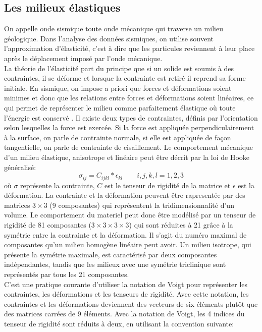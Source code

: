 \subsection{Les milieux élastiques}
 On appelle onde sismique toute onde mécanique qui traverse un milieu géologique. Dans l'analyse des données sismiques, on utilise souvent l'approximation d'élasticité, c'est à dire que les particules reviennent à leur place après le déplacement imposé par l'onde mécanique.\\
La théorie de l'élasticité part du principe que si un solide est soumis à des contraintes, il se déforme et lorsque la contrainte est retiré il reprend sa forme initiale. En sismique, on impose a priori que forces et déformations soient minimes et donc que les relations entre forces et déformations soient linéaires, ce qui permet de représenter le milieu comme parfaitement élastique où toute l'énergie est conservé \citep{Sheriff1995}. Il existe deux types de contraintes, définis par l’orientation selon lesquelles la force est exercée. Si la force est appliquée perpendiculairement à la surface, on parle de contrainte normale, si elle est appliquée de façon tangentielle, on parle de contrainte de cisaillement. Le comportement mécanique d’un milieu élastique, anisotrope et linéaire peut être décrit par la loi de Hooke généralisé:
\begin{equation}
\sigma_{ij} = C_{ijkl}*\epsilon_{kl} \qquad i,j,k,l = 1,2,3
\label{eq:hooke}
\end{equation}
où $\sigma$ représente la contrainte, $C$ est le tenseur de rigidité de la matrice et $\epsilon$ est la déformation.
La contrainte et la déformation peuvent être rapresentée par des matrices $3 \times 3$ (9 composantes) qui représentent la tridimensionnalité d’un volume. Le comportement du materiel peut donc être modélisé par un tenseur de rigidité de 81 composantes ($3 \times 3 \times 3 \times 3$) qui sont réduites à 21 grâce à la symétrie entre la contrainte et la déformation. Il s’agit du numéro maximal de composantes qu’un milieu homogène linéaire peut avoir. Un milieu isotrope, qui présente la symétrie maximale, est caractérisé par deux composantes indépendantes, tandis que les milieux avec une symétrie triclinique sont représentés par tous les 21 composantes.\\
C’est une pratique courante d’utiliser la notation de Voigt pour représenter les contraintes, les déformations et les tenseurs de rigidité. Avec cette notation, les contraintes et les déformations deviennent des vecteurs de six éléments plutôt que des matrices carrées de 9 éléments. Avec la notation de Voigt, les 4 indices du tenseur de rigidité sont réduits à deux, en utilisant la convention suivante:
